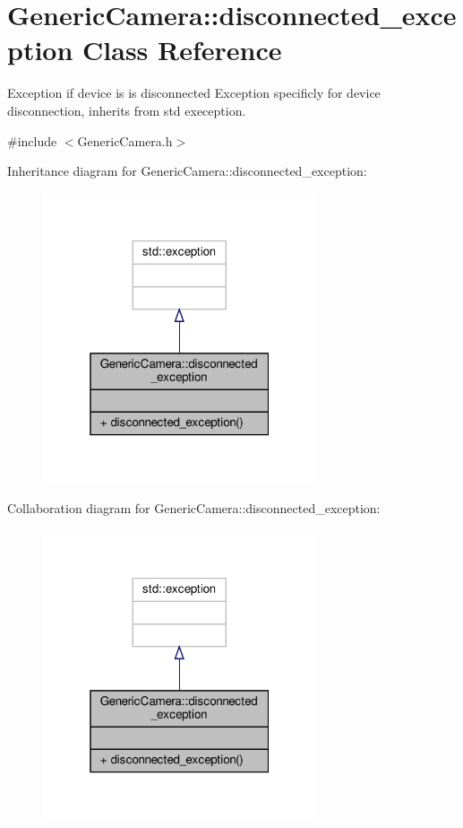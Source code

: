 \hypertarget{class_generic_camera_1_1disconnected__exception}{}\section{Generic\+Camera\+:\+:disconnected\+\_\+exception Class Reference}
\label{class_generic_camera_1_1disconnected__exception}


Exception if device is is disconnected Exception specificly for device disconnection, inherits from std exeception.  




{\ttfamily \#include $<$Generic\+Camera.\+h$>$}



Inheritance diagram for Generic\+Camera\+:\+:disconnected\+\_\+exception\+:\nopagebreak
\begin{figure}[H]
\begin{center}
\leavevmode
\includegraphics[width=229pt]{class_generic_camera_1_1disconnected__exception__inherit__graph}
\end{center}
\end{figure}


Collaboration diagram for Generic\+Camera\+:\+:disconnected\+\_\+exception\+:\nopagebreak
\begin{figure}[H]
\begin{center}
\leavevmode
\includegraphics[width=229pt]{class_generic_camera_1_1disconnected__exception__coll__graph}
\end{center}
\end{figure}
